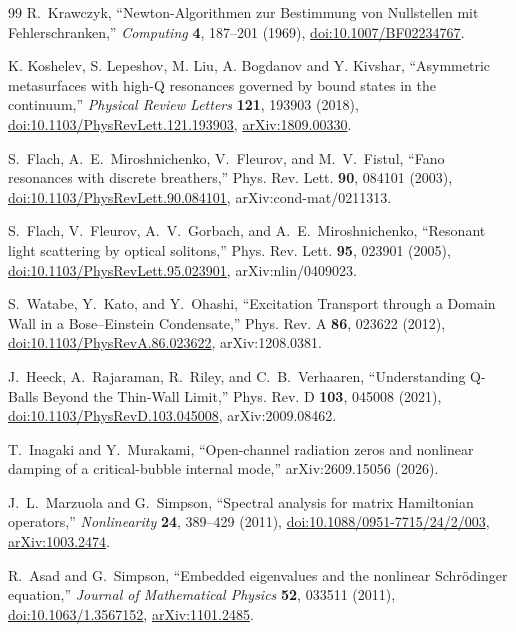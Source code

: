 \begin{thebibliography}{99}
R.~Krawczyk, ``Newton-Algorithmen zur Bestimmung von Nullstellen mit
Fehlerschranken,'' \emph{Computing} \textbf{4}, 187--201 (1969),
\href{https://doi.org/10.1007/BF02234767}{doi:10.1007/BF02234767}.

K. Koshelev, S. Lepeshov, M. Liu, A. Bogdanov and Y. Kivshar,
``Asymmetric metasurfaces with high-Q resonances governed by bound states
in the continuum,'' \emph{Physical Review Letters} \textbf{121}, 193903 (2018),
\href{https://doi.org/10.1103/PhysRevLett.121.193903}{doi:10.1103/PhysRevLett.121.193903},
\href{https://arxiv.org/abs/1809.00330}{arXiv:1809.00330}.

S.~Flach, A.~E.~Miroshnichenko, V.~Fleurov, and M.~V.~Fistul,
``Fano resonances with discrete breathers,''
Phys. Rev. Lett. \textbf{90}, 084101 (2003),
\href{https://doi.org/10.1103/PhysRevLett.90.084101}{doi:10.1103/PhysRevLett.90.084101},
arXiv:cond-mat/0211313.

S.~Flach, V.~Fleurov, A.~V.~Gorbach, and A.~E.~Miroshnichenko,
``Resonant light scattering by optical solitons,''
Phys. Rev. Lett. \textbf{95}, 023901 (2005),
\href{https://doi.org/10.1103/PhysRevLett.95.023901}{doi:10.1103/PhysRevLett.95.023901},
arXiv:nlin/0409023.

S.~Watabe, Y.~Kato, and Y.~Ohashi,
``Excitation Transport through a Domain Wall in a Bose--Einstein Condensate,''
Phys. Rev. A \textbf{86}, 023622 (2012),
\href{https://doi.org/10.1103/PhysRevA.86.023622}{doi:10.1103/PhysRevA.86.023622},
arXiv:1208.0381.

J.~Heeck, A.~Rajaraman, R.~Riley, and C.~B.~Verhaaren,
``Understanding Q-Balls Beyond the Thin-Wall Limit,''
Phys. Rev. D \textbf{103}, 045008 (2021),
\href{https://doi.org/10.1103/PhysRevD.103.045008}{doi:10.1103/PhysRevD.103.045008},
arXiv:2009.08462.

T.~Inagaki and Y.~Murakami,
``Open-channel radiation zeros and nonlinear damping of a critical-bubble
internal mode,'' arXiv:2609.15056 (2026).

J.~L.~Marzuola and G.~Simpson,
``Spectral analysis for matrix Hamiltonian operators,''
\emph{Nonlinearity} \textbf{24}, 389--429 (2011),
\href{https://doi.org/10.1088/0951-7715/24/2/003}{doi:10.1088/0951-7715/24/2/003},
\href{https://arxiv.org/abs/1003.2474}{arXiv:1003.2474}.

R.~Asad and G.~Simpson,
``Embedded eigenvalues and the nonlinear Schr\"odinger equation,''
\emph{Journal of Mathematical Physics} \textbf{52}, 033511 (2011),
\href{https://doi.org/10.1063/1.3567152}{doi:10.1063/1.3567152},
\href{https://arxiv.org/abs/1101.2485}{arXiv:1101.2485}.


\end{thebibliography}

